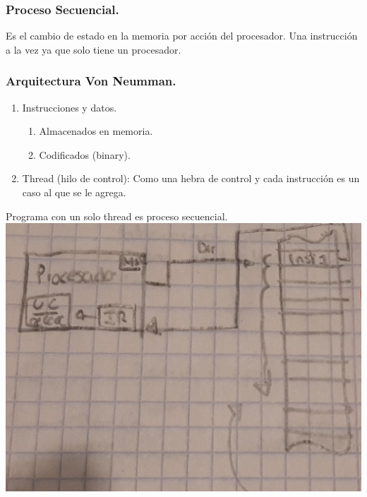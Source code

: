 \documentclass[12pt]{article}
\begin{document}
{\color{blue} \subsubsection*{\textbf{Proceso Secuencial.}}}

Es el cambio de estado en la memoria por acción del procesador. Una instrucción a la vez ya que solo tiene un procesador.
\\

{\color{blue} \subsubsection*{\textbf{Arquitectura Von Neumman.}}}
\vspace{1em}
\begin{enumerate}
    \item Instrucciones y datos.
    \begin{enumerate}
        \item Almacenados en memoria.
        \item Codificados (binary).
    \end{enumerate}
    \item Thread (hilo de control): Como una hebra de control y cada instrucción es un caso al que se le agrega.
\end{enumerate}

Programa con un solo thread es proceso secuencial.\\

\includegraphics[scale = 0.25]{images/esquema5.jpeg} \\
\end{document}
